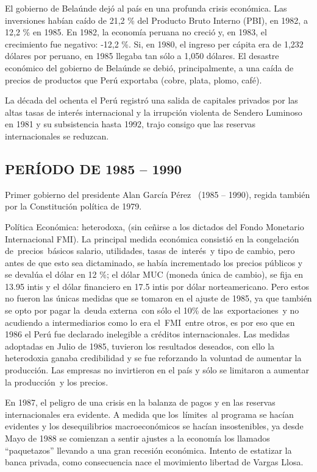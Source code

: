 \documentclass[
  jou,
  floatsintext,
  longtable,
  a4paper,
  nolmodern,
  notxfonts,
  notimes,
  colorlinks=true,linkcolor=blue,citecolor=blue,urlcolor=blue]{apa7}
\begin{document}
El gobierno de Belaúnde dejó al país en una profunda crisis económica.
Las inversiones habían caído de 21,2 \% del Producto Bruto Interno
(PBI), en 1982, a 12,2 \% en 1985. En 1982, la economía peruana no
creció y, en 1983, el crecimiento fue negativo: -12,2 \%. Si, en 1980,
el ingreso per cápita era de 1,232 dólares por peruano, en 1985 llegaba
tan sólo a 1,050 dólares. El desastre económico del gobierno de Belaúnde
se debió, principalmente, a una caída de precios de productos que Perú
exportaba (cobre, plata, plomo, café).

La década del ochenta el Perú registró una salida de capitales privados
por las altas tasas de interés internacional y la irrupción violenta de
Sendero Luminoso en 1981 y su subsistencia hasta 1992, trajo consigo que
las reservas internacionales se reduzcan.

\subsection{PERÍODO DE 1985 -- 1990}\label{peruxedodo-de-1985-1990}

Primer gobierno del presidente Alan García Pérez~ (1985 -- 1990), regida
también por la Constitución política de 1979.

Política Económica: heterodoxa, (sin ceñirse a los dictados del Fondo
Monetario Internacional FMI). La principal medida económica consistió en
la congelación de~precios~básicos salario, utilidades, tasas
de~interés~y tipo de cambio, pero antes de que esto sea dictaminado, se
había incrementado los precios públicos y se devalúa el dólar en 12 \%;
el dólar MUC (moneda única de cambio), se fija en 13.95 intis y el dólar
financiero en 17.5 intis por dólar norteamericano. Pero estos no fueron
las únicas medidas que se tomaron en el ajuste de 1985, ya que también
se opto por pagar la~deuda externa~con sólo el 10\% de
las~exportaciones~y no acudiendo a intermediarios como lo era
el~FMI~entre otros, es por eso que en 1986 el Perú fue declarado
inelegible a créditos internacionales. Las medidas adoptadas en Julio de
1985, tuvieron los resultados deseados, con ello la heterodoxia ganaba
credibilidad y se fue reforzando la voluntad de aumentar la producción.
Las empresas no invirtieron en el país y sólo se limitaron a aumentar la
producción~y los precios.

En 1987, el peligro de una crisis en la balanza de pagos y en las
reservas internacionales era evidente. A medida que los~límites~al
programa se hacían evidentes y los desequilibrios macroeconómicos se
hacían insostenibles, ya desde Mayo de 1988 se comienzan a sentir
ajustes a la economía los llamados ``paquetazos'' llevando a una gran
recesión económica. Intento de estatizar la banca privada, como
consecuencia nace el movimiento libertad de Vargas Llosa.
\end{document}
